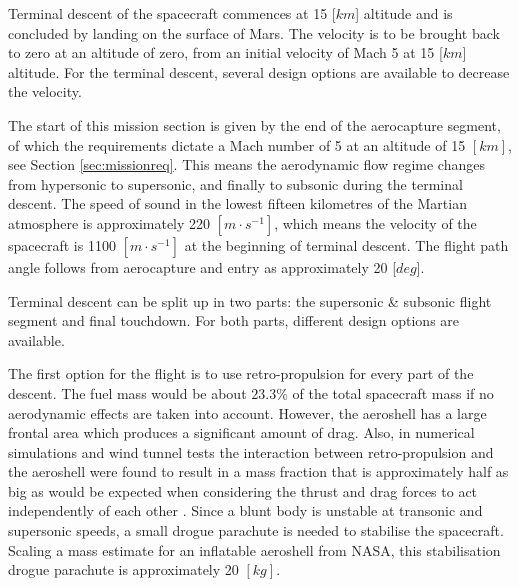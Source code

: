 Terminal descent of the spacecraft commences at 15 [$km$] altitude and is concluded by landing on the surface of Mars. The velocity is to be brought back to zero at an altitude of zero, from an initial velocity of Mach 5 at 15 [$km$] altitude. For the terminal descent, several design options are available to decrease the velocity.%

The start of this mission section is given by the end of the aerocapture segment, of which the requirements dictate a Mach number of 5 at an altitude of 15 $[km]$, see Section \ref{sec:missionreq}. This means the aerodynamic flow regime changes from hypersonic to supersonic, and finally to subsonic during the terminal descent. The speed of sound in the lowest fifteen kilometres of the Martian atmosphere is approximately 220 $[m\cdot s^{-1}]$, which means the velocity of the spacecraft is 1100 $[m\cdot s^{-1}]$ at the beginning of terminal descent. The flight path angle follows from aerocapture and entry as approximately 20 [$deg$].%

Terminal descent can be split up in two parts: the supersonic \& subsonic flight segment and final touchdown. For both parts, different design options are available.

The first option for the flight is to use retro-propulsion for every part of the descent. The fuel mass would be about $23.3\%$ of the total spacecraft mass if no aerodynamic effects are taken into account. However, the aeroshell has a large frontal area which produces a significant amount of drag. Also, in numerical simulations and wind tunnel tests the interaction between retro-propulsion and the aeroshell were found to result in a mass fraction that is approximately half as big as would be expected when considering the thrust and drag forces to act independently of each other \cite{Korzun2009}. Since a blunt body is unstable at transonic and supersonic speeds, a small drogue parachute is needed to stabilise the spacecraft. Scaling a mass estimate for an inflatable aeroshell from NASA, this stabilisation drogue parachute is approximately 20 $[kg]$.

